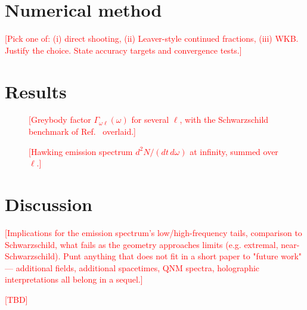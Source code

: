 \documentclass[
  aps,
  prd,
  preprint,      %
  superscriptaddress,
  nofootinbib,
  amsmath,
  amssymb,
  floatfix,
]{revtex4-2}
\begin{document}
\section{Numerical method}
\label{sec:numerics}

\textcolor{red}{[Pick one of: (i) direct shooting, (ii) Leaver-style continued
fractions, (iii) WKB. Justify the choice. State accuracy targets and
convergence tests.]}

\section{Results}
\label{sec:results}

\begin{figure}[t]
  \centering
  \caption{\textcolor{red}{[Greybody factor $\Gamma_{\omega\ell}(\omega)$ for
  several $\ell$, with the Schwarzschild benchmark of Ref.~\cite{Page1976}
  overlaid.]}}
  \label{fig:greybody}
\end{figure}

\begin{figure}[t]
  \centering
  \caption{\textcolor{red}{[Hawking emission spectrum
  $d^2N/(dt\, d\omega)$ at infinity, summed over $\ell$.]}}
  \label{fig:spectrum}
\end{figure}

\section{Discussion}
\label{sec:discussion}

\textcolor{red}{[Implications for the emission spectrum's low/high-frequency
tails, comparison to Schwarzschild, what fails as the geometry approaches
limits (e.g. extremal, near-Schwarzschild). Punt anything that does not fit
in a short paper to "future work" --- additional fields, additional
spacetimes, QNM spectra, holographic interpretations all belong in a sequel.]}

\begin{acknowledgments}
\textcolor{red}{[TBD]}
\end{acknowledgments}
\end{document}
